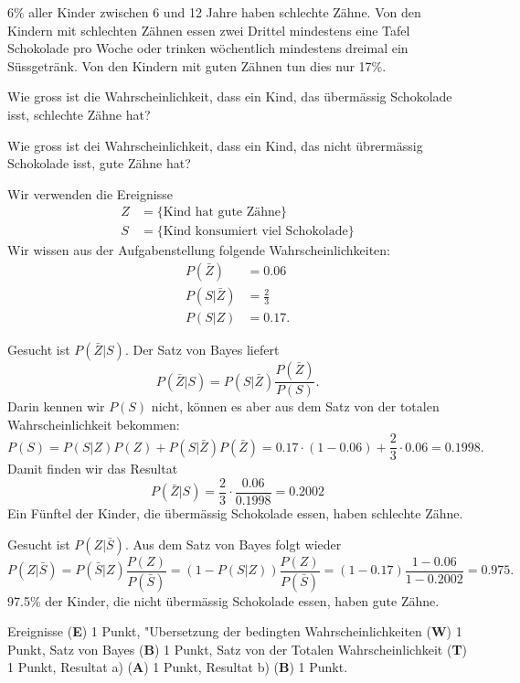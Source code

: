 $6\%$ aller Kinder zwischen 6 und 12 Jahre haben schlechte Zähne.
Von den Kindern mit schlechten Zähnen essen zwei Drittel mindestens eine
Tafel Schokolade pro Woche oder trinken wöchentlich mindestens
dreimal ein Süssgetränk. Von den Kindern mit guten Zähnen tun dies
nur 17\%.
\begin{teilaufgaben}
\item Wie gross ist die Wahrscheinlichkeit, dass ein Kind, das übermässig
Schokolade isst, schlechte Zähne hat?
\item Wie gross ist dei Wahrscheinlichkeit, dass ein Kind, das nicht
übrermässig Schokolade isst, gute Zähne hat?
\end{teilaufgaben}


\begin{loesung}
Wir verwenden die Ereignisse
\begin{align*}
Z&=\{\text{Kind hat gute Zähne}\}
\\
S&=\{\text{Kind konsumiert viel Schokolade}\}
\end{align*}
Wir wissen aus der Aufgabenstellung folgende Wahrscheinlichkeiten:
\begin{align*}
P(\bar Z)&=0.06\\
P(S|\bar Z)&=\frac23\\
P(S|Z)&=0.17.
\end{align*}
\begin{teilaufgaben}
\item Gesucht ist $P(\bar Z|S)$. Der Satz von Bayes liefert
\[
P(\bar Z|S)= P(S|\bar Z) \frac{P(\bar Z)}{P(S)}.
\]
Darin kennen wir $P(S)$ nicht, können es aber aus dem Satz von der
totalen Wahrscheinlichkeit bekommen:
\[
P(S)=P(S|Z)P(Z)+P(S|\bar Z)P(\bar Z)
=0.17\cdot (1-0.06)+\frac23\cdot 0.06=0.1998.
\]
Damit finden wir das Resultat
\[
P(\bar Z|S)=\frac23\cdot \frac{0.06}{0.1998}=0.2002
\]
Ein Fünftel der Kinder, die übermässig Schokolade essen, haben
schlechte Zähne.
\item Gesucht ist $P(Z|\bar S)$. Aus dem Satz von Bayes folgt wieder
\[
P(Z|\bar S)=P(\bar S|Z)\frac{P(Z)}{P(\bar S)}=(1-P(S|Z))\frac{P(Z)}{P(\bar S)}
=(1-0.17)\frac{1-0.06}{1-0.2002}=0.975.
\]
97.5\% der Kinder, die nicht übermässig Schokolade essen, haben gute 
Zähne.
\qedhere
\end{teilaufgaben}
\end{loesung}

\begin{bewertung}
Ereignisse ({\bf E}) 1 Punkt,
"Ubersetzung der bedingten Wahrscheinlichkeiten ({\bf W}) 1 Punkt,
Satz von Bayes ({\bf B}) 1 Punkt,
Satz von der Totalen Wahrscheinlichkeit ({\bf T}) 1 Punkt,
Resultat a) ({\bf A}) 1 Punkt,
Resultat b) ({\bf B}) 1 Punkt.
\end{bewertung}



